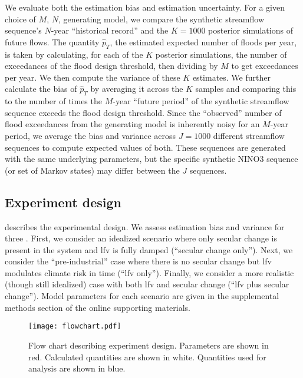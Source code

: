 \documentclass[
  draft,
  linenumbers
]{agujournal2019}
\begin{document}
We evaluate both the estimation bias and estimation uncertainty.
For a given choice of $M$, $N$,  generating model, we compare the synthetic streamflow sequence's $N$-year ``historical record'' and the $K=1000$ posterior simulations of future flows.
The quantity $\hat{p}_T$, the estimated expected number of floods per year, is taken by calculating, for each of the $K$ posterior simulations, the number of exceedances of the flood design threshold, then dividing by $M$ to get exceedances per year.
We then compute the variance of these $K$ estimates.
We further calculate the bias of $\hat{p}_T$ by averaging it across the $K$ samples and comparing this to the number of times the $M$-year ``future period'' of the synthetic streamflow sequence exceeds the flood design threshold.
Since the ``observed'' number of flood exceedances from the generating model is inherently noisy for an $M$-year period, we average the bias and variance across $J=1000$ different streamflow sequences to compute expected values of both.
These sequences are generated with the same underlying parameters, but the specific synthetic NINO3 sequence (or set of Markov states) may differ between the $J$ sequences.

\subsection{Experiment design}\label{sec:methods-computation}

 describes the experimental design.
We assess estimation bias and variance for three .
First, we consider an idealized scenario where only secular change is present in the system and \gls{lfv} is fully damped (``secular change only'').
Next, we consider the ``pre-industrial'' case where there is no secular change but \gls{lfv} modulates climate risk in time (``\acrlong{lfv} only'').
Finally, we consider a more realistic (though still idealized) case with both \gls{lfv} and secular change (``\acrlong{lfv} plus secular change'').
Model parameters for each scenario are given in the supplemental methods section of the online supporting materials.

\begin{figure}
  \texttt{[image: flowchart.pdf]}
  \caption{
    Flow chart describing experiment design.
    Parameters are shown in red.
    Calculated quantities are shown in white.
    Quantities used for analysis are shown in blue.
  }\label{fig:flowchart}
\end{figure}
\end{document}
